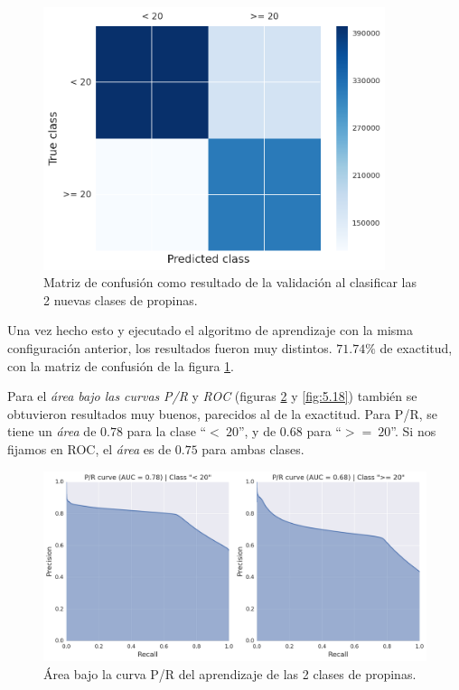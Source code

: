 \begin{figure}[H]
  \centering
  \includegraphics[width=100mm]{figures/ch_05/confusion_matrix_2.png}
  \caption{Matriz de confusión como resultado de la validación al clasificar las 2 nuevas clases de propinas.}
  \label{fig:5.16}
\end{figure}

Una vez hecho esto y ejecutado el algoritmo de aprendizaje con la misma configuración anterior, los resultados fueron muy distintos. $71.74\%$ de exactitud, con la matriz de confusión de la figura \ref{fig:5.16}.

Para el \emph{área bajo las curvas} \emph{P/R} y \emph{ROC} (figuras \ref{fig:5.17} y \ref{fig:5.18}) también se obtuvieron resultados muy buenos, parecidos al de la exactitud. Para P/R, se tiene un \emph{área} de $0.78$ para la clase ``$<\:20$'', y de $0.68$ para ``$>=\:20$''. Si nos fijamos en ROC, el \emph{área} es de $0.75$ para ambas clases.

\begin{figure}[H]
  \centering
  \includegraphics[width=140mm]{figures/ch_05/pr_auc.png}
  \caption{Área bajo la curva P/R del aprendizaje de las 2 clases de propinas.}
  \label{fig:5.17}
\end{figure}

